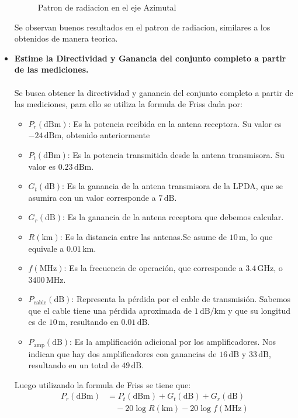 \begin{itemize}
\begin{figure}
			\caption{Patron de radiacion en el eje Azimutal}
		\end{figure}
		Se observan buenos resultados en el patron de radiacion, similares a los obtenidos de manera teorica.
		\item{\textbf{Estime la Directividad y Ganancia del conjunto completo a partir de las mediciones.}}\\\\
		
		Se busca obtener la directividad y ganancia del conjunto completo a partir de las mediciones, para ello se utiliza la formula de Friss dada por:
		\begin{itemize}
			\item \(P_r (\text{dBm})\): Es la potencia recibida en la antena receptora. Su valor es \(-24 \, \text{dBm}\), obtenido anteriormente
			\item \(P_t (\text{dBm})\): Es la potencia transmitida desde la antena transmisora. Su valor es \(0.23 \, \text{dBm}\).
			\item \(G_t (\text{dB})\): Es la ganancia de la antena transmisora de la LPDA, que se asumira con un valor corresponde a \(7 \, \text{dB}\).
			\item \(G_r (\text{dB})\): Es la ganancia de la antena receptora que debemos calcular.
			\item \(R (\text{km})\): Es la distancia entre las antenas.Se asume de  \(10 \, \text{m}\), lo que equivale a \(0.01 \, \text{km}\).
			\item \(f (\text{MHz})\): Es la frecuencia de operación, que corresponde a \(3.4 \, \text{GHz}\), o \(3400 \, \text{MHz}\).
			\item \(P_{\text{cable}} (\text{dB})\): Representa la pérdida por el cable de transmisión. Sabemos que el cable tiene una pérdida aproximada de \(1 \, \text{dB/km}\) y que su longitud es de \(10 \, \text{m}\), resultando en \(0.01 \, \text{dB}\).
			\item \(P_{\text{amp}} (\text{dB})\): Es la amplificación adicional por los amplificadores. Nos indican que hay dos amplificadores con ganancias de \(16 \, \text{dB}\) y \(33 \, \text{dB}\), resultando en un total de \(49 \, \text{dB}\).
		\end{itemize}
		Luego utilizando la formula de Friss se tiene que:
		\begin{align*}
			P_r (\text{dBm}) &= P_t (\text{dBm}) + G_t (\text{dB}) + G_r (\text{dB}) \\
			&\quad - 20 \log R (\text{km}) - 20 \log f (\text{MHz}) \\

\end{align*}
\end{itemize}

